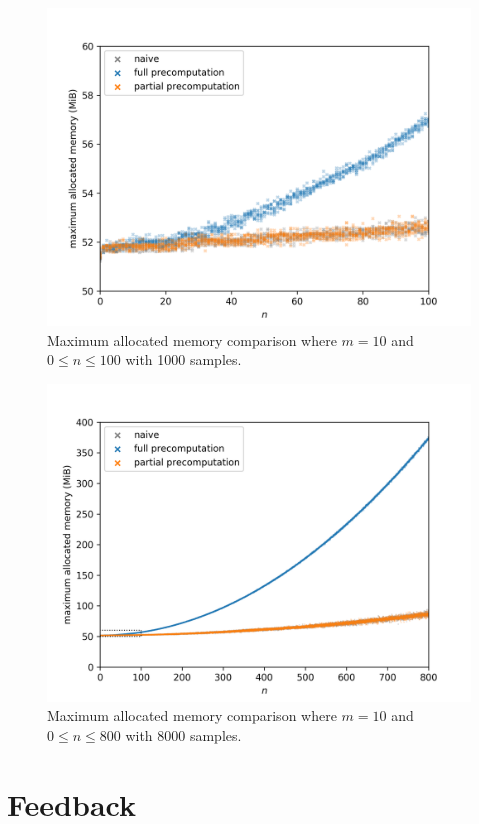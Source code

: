 \begin{figure}[H]
	\centering
	\includegraphics[scale=0.7]{figures/precomputation_memory_small}
	\caption{Maximum allocated memory comparison where $m=10$ and $0\leq n\leq 100$ with 1000 samples.}
\end{figure}

\begin{figure}[H]
	\centering
	\includegraphics[scale=0.7]{figures/precomputation_memory_big}
	\caption{Maximum allocated memory comparison where $m=10$ and $0\leq n\leq 800$ with 8000 samples.}
\end{figure}

\section{Feedback}

